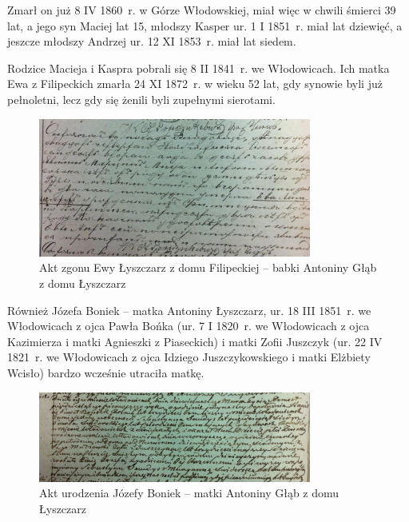 Zmarł on już 8 IV 1860~r. w Górze Włodowskiej, miał więc w chwili śmierci 39 lat, a jego syn Maciej lat 15, młodszy Kasper ur. 1 I 1851~r. miał lat dziewięć, a jeszcze młodszy Andrzej ur. 12 XI 1853~r. miał lat siedem.


Rodzice Macieja i Kaspra pobrali się 8 II 1841~r. we Włodowicach. Ich matka Ewa z Filipeckich zmarła 24 XI 1872~r. w wieku 52 lat, gdy synowie byli już pełnoletni, lecz gdy się żenili byli zupełnymi sierotami.

\begin{figure}[!h]
\begin{center}
\includegraphics[width=0.8\textwidth]{zdjecia/akt_zgonu_ewy_lyszczarz.jpg}
\caption[Akt zgonu Ewy Łyszczarz z domu Filipeckiej]{Akt zgonu Ewy Łyszczarz z domu Filipeckiej -- babki Antoniny Głąb z domu Łyszczarz}
\label{rys:akt_zgonu_ewy_lyszczarz}
\end{center}
\end{figure}

Również Józefa Boniek -- matka Antoniny Łyszczarz, ur. 18 III 1851~r. we Włodowicach z ojca Pawła Bońka (ur. 7 I 1820~r. we Włodowicach z ojca Kazimierza i matki Agnieszki z Piaseckich) i matki Zofii Juszczyk (ur. 22 IV 1821~r. we Włodowicach z ojca Idziego Juszczykowskiego i matki Elżbiety Wcisło) bardzo wcześnie utraciła matkę.

\begin{figure}[!h]
\begin{center}
\includegraphics[width=0.8\textwidth]{zdjecia/akt_urodzenia_jozefy_boniek.jpg}
\caption[Akt urodzenia Józefy Boniek]{Akt urodzenia Józefy Boniek -- matki Antoniny Głąb z domu Łyszczarz}
\label{rys:akt_urodzenia_jozefy_boniek}
\end{center}
\end{figure}

